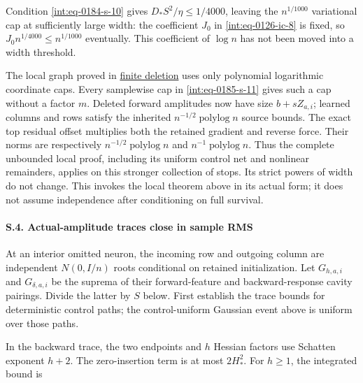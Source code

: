 
Condition \eqref{int:eq-0184-s-10} gives \(D_*S^2/\eta\le1/4000\), leaving the \(n^{1/1000}\) variational cap at sufficiently large width: the coefficient \(J_0\) in \eqref{int:eq-0126-ic-8} is fixed, so \(J_0n^{1/4000}\le n^{1/1000}\) eventually. This coefficient of \(\log n\) has not been moved into a width threshold.



The local graph proved in \hyperref[int:source-local-insertion]{finite deletion} uses only polynomial logarithmic coordinate caps. Every samplewise cap in \eqref{int:eq-0185-s-11} gives such a cap without a factor \(m\). Deleted forward amplitudes now have size \(b+sZ_{a,\allowbreak i}\); learned columns and rows satisfy the inherited \(n^{-1/2}\operatorname{polylog}n\) source bounds. The exact top residual offset multiplies both the retained gradient and reverse force. Their norms are respectively \(n^{-1/2}\operatorname{polylog}n\) and \(n^{-1}\operatorname{polylog}n\). Thus the complete unbounded local proof, including its uniform control net and nonlinear remainders, applies on this stronger collection of stops. Its strict powers of width do not change. This invokes the local theorem above in its actual form; it does not assume independence after conditioning on full survival.


\paragraph{S.4. Actual-amplitude traces close in sample RMS}

\mbox{}\par\smallskip


At an interior omitted neuron, the incoming row and outgoing column are independent \(N(0,\allowbreak I/n)\) roots conditional on retained initialization. Let \(G_{h,\allowbreak a,\allowbreak i}\) and \(G_{\delta,\allowbreak a,\allowbreak i}\) be the suprema of their forward-feature and backward-response cavity pairings. Divide the latter by \(S\) below. First establish the trace bounds for deterministic control paths; the control-uniform Gaussian event above is uniform over those paths.



In the backward trace, the two endpoints and \(h\) Hessian factors use Schatten exponent \(h+2\). The zero-insertion term is at most \(2H_*^2\). For \(h\ge1\), the integrated bound is



